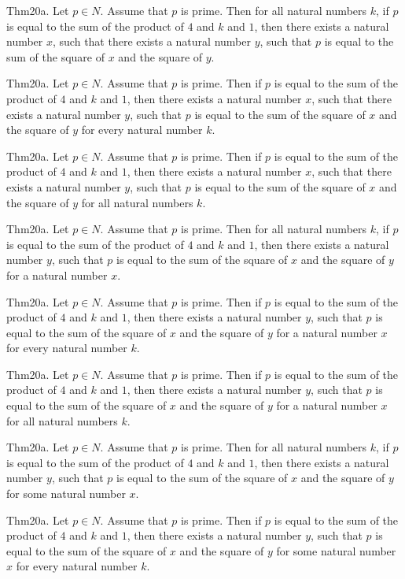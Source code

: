 \documentclass{article}
\begin{document}
Thm20a. Let $p \in N$. Assume that $p$ is prime. Then for all natural numbers $k$, if $p$ is equal to the sum of the product of $4$ and $k$ and $1$, then there exists a natural number $x$, such that there exists a natural number $y$, such that $p$ is equal to the sum of the square of $x$ and the square of $y$.

Thm20a. Let $p \in N$. Assume that $p$ is prime. Then if $p$ is equal to the sum of the product of $4$ and $k$ and $1$, then there exists a natural number $x$, such that there exists a natural number $y$, such that $p$ is equal to the sum of the square of $x$ and the square of $y$ for every natural number $k$.

Thm20a. Let $p \in N$. Assume that $p$ is prime. Then if $p$ is equal to the sum of the product of $4$ and $k$ and $1$, then there exists a natural number $x$, such that there exists a natural number $y$, such that $p$ is equal to the sum of the square of $x$ and the square of $y$ for all natural numbers $k$.

Thm20a. Let $p \in N$. Assume that $p$ is prime. Then for all natural numbers $k$, if $p$ is equal to the sum of the product of $4$ and $k$ and $1$, then there exists a natural number $y$, such that $p$ is equal to the sum of the square of $x$ and the square of $y$ for a natural number $x$.

Thm20a. Let $p \in N$. Assume that $p$ is prime. Then if $p$ is equal to the sum of the product of $4$ and $k$ and $1$, then there exists a natural number $y$, such that $p$ is equal to the sum of the square of $x$ and the square of $y$ for a natural number $x$ for every natural number $k$.

Thm20a. Let $p \in N$. Assume that $p$ is prime. Then if $p$ is equal to the sum of the product of $4$ and $k$ and $1$, then there exists a natural number $y$, such that $p$ is equal to the sum of the square of $x$ and the square of $y$ for a natural number $x$ for all natural numbers $k$.

Thm20a. Let $p \in N$. Assume that $p$ is prime. Then for all natural numbers $k$, if $p$ is equal to the sum of the product of $4$ and $k$ and $1$, then there exists a natural number $y$, such that $p$ is equal to the sum of the square of $x$ and the square of $y$ for some natural number $x$.

Thm20a. Let $p \in N$. Assume that $p$ is prime. Then if $p$ is equal to the sum of the product of $4$ and $k$ and $1$, then there exists a natural number $y$, such that $p$ is equal to the sum of the square of $x$ and the square of $y$ for some natural number $x$ for every natural number $k$.
\end{document}
